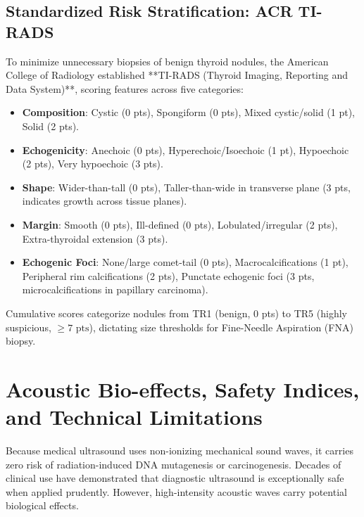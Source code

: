 \documentclass[11pt,a4paper]{article}
\begin{document}
\subsection{Standardized Risk Stratification: ACR TI-RADS}
To minimize unnecessary biopsies of benign thyroid nodules, the American College of Radiology established **TI-RADS (Thyroid Imaging, Reporting and Data System)**, scoring features across five categories:
\begin{itemize}
    \item \textbf{Composition}: Cystic (0 pts), Spongiform (0 pts), Mixed cystic/solid (1 pt), Solid (2 pts).
    \item \textbf{Echogenicity}: Anechoic (0 pts), Hyperechoic/Isoechoic (1 pt), Hypoechoic (2 pts), Very hypoechoic (3 pts).
    \item \textbf{Shape}: Wider-than-tall (0 pts), Taller-than-wide in transverse plane (3 pts, indicates growth across tissue planes).
    \item \textbf{Margin}: Smooth (0 pts), Ill-defined (0 pts), Lobulated/irregular (2 pts), Extra-thyroidal extension (3 pts).
    \item \textbf{Echogenic Foci}: None/large comet-tail (0 pts), Macrocalcifications (1 pt), Peripheral rim calcifications (2 pts), Punctate echogenic foci (3 pts, microcalcifications in papillary carcinoma).
\end{itemize}
Cumulative scores categorize nodules from TR1 (benign, 0 pts) to TR5 (highly suspicious, $\ge 7\text{ pts}$), dictating size thresholds for Fine-Needle Aspiration (FNA) biopsy.

\section{Acoustic Bio-effects, Safety Indices, and Technical Limitations}

Because medical ultrasound uses non-ionizing mechanical sound waves, it carries zero risk of radiation-induced DNA mutagenesis or carcinogenesis. Decades of clinical use have demonstrated that diagnostic ultrasound is exceptionally safe when applied prudently. However, high-intensity acoustic waves carry potential biological effects.
\end{document}
